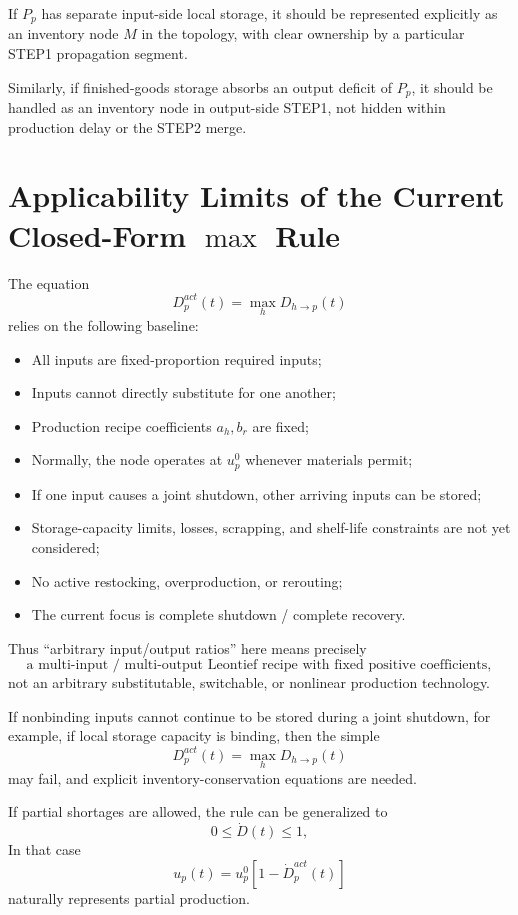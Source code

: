 \documentclass[11pt]{article}
\begin{document}
If \(P_p\) has separate input-side local storage,
it should be represented explicitly as an inventory node \(M\) in the topology,
with clear ownership by a particular STEP1 propagation segment.

Similarly,
if finished-goods storage absorbs an output deficit of \(P_p\),
it should be handled as an inventory node in output-side STEP1,
not hidden within production delay or the STEP2 merge.

\section{Applicability Limits of the Current Closed-Form \(\max\) Rule}

The equation
\[
D_p^{act}(t)=\max_hD_{h\to p}(t)
\]
relies on the following baseline:
\begin{itemize}
    \item All inputs are fixed-proportion required inputs;
    \item Inputs cannot directly substitute for one another;
    \item Production recipe coefficients \(a_h,b_r\) are fixed;
    \item Normally, the node operates at \(u_p^0\) whenever materials permit;
    \item If one input causes a joint shutdown, other arriving inputs can be stored;
    \item Storage-capacity limits, losses, scrapping, and shelf-life constraints are not yet considered;
    \item No active restocking, overproduction, or rerouting;
    \item The current focus is complete shutdown / complete recovery.
\end{itemize}

Thus ``arbitrary input/output ratios'' here means precisely
\[
\boxed{
\text{a multi-input / multi-output Leontief recipe with fixed positive coefficients},
}
\]
not an arbitrary substitutable, switchable, or nonlinear production technology.

If nonbinding inputs cannot continue to be stored during a joint shutdown,
for example, if local storage capacity is binding,
then the simple
\[
D_p^{act}(t)=\max_hD_{h\to p}(t)
\]
may fail, and explicit inventory-conservation equations are needed.

If partial shortages are allowed,
the rule can be generalized to
\[
0\le\dot D(t)\le1,
\]
In that case
\[
u_p(t)
=
u_p^0
[1-\dot D_p^{act}(t)]
\]
naturally represents partial production.
\end{document}

